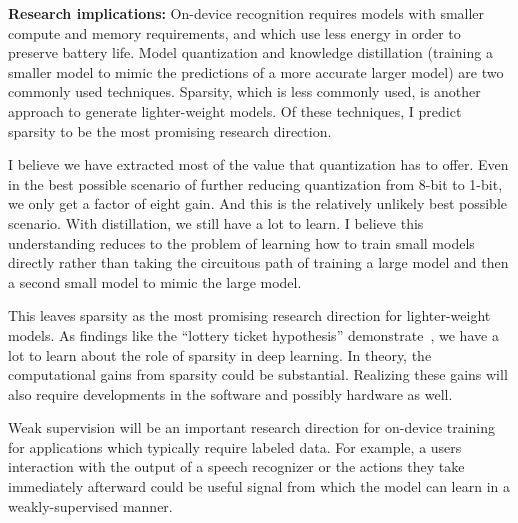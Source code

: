 {\bf Research implications:} On-device recognition requires models with smaller
compute and memory requirements, and which use less energy in order to preserve
battery life. Model quantization and knowledge distillation (training a smaller
model to mimic the predictions of a more accurate larger model) are two commonly
used techniques. Sparsity, which is less commonly used, is another approach to
generate lighter-weight models. Of these techniques, I predict sparsity to be
the most promising research direction.

I believe we have extracted most of the value that quantization has to offer.
Even in the best possible scenario of further reducing quantization from 8-bit
to 1-bit, we only get a factor of eight gain. And this is the relatively
unlikely best possible scenario. With distillation, we still have a lot to
learn. I believe this understanding reduces to the problem of learning how to
train small models directly rather than taking the circuitous path of training
a large model and then a second small model to mimic the large model.

This leaves sparsity as the most promising research direction for
lighter-weight models. As findings like the ``lottery ticket hypothesis''
demonstrate~\citep{frankle2018lottery}, we have a lot to learn about the role
of sparsity in deep learning. In theory, the computational gains from sparsity
could be substantial. Realizing these gains will also require developments in
the software and possibly hardware as well.

Weak supervision will be an important research direction for on-device training
for applications which typically require labeled data. For example, a users
interaction with the output of a speech recognizer or the actions they take
immediately afterward could be useful signal from which the model can learn in
a weakly-supervised manner.

